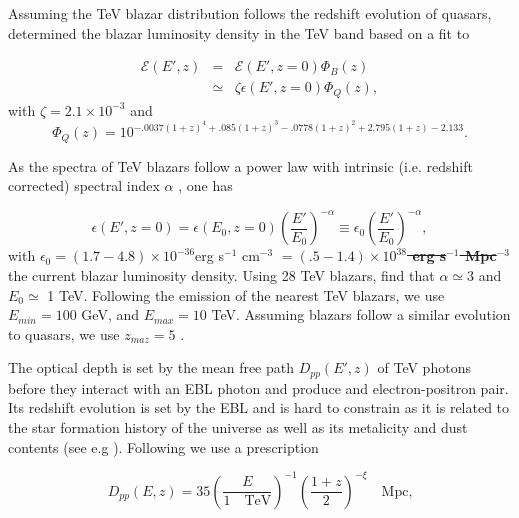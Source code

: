 \documentclass[twocolumns]{emulateapj}
\newcommand\ALc[1]{{\color{red} \bf #1}} %
\begin{document}
Assuming the TeV blazar distribution follows the redshift evolution of quasars, \citet{2012ApJ...752...22B} determined the blazar luminosity density in the TeV band based on a fit to \citet{2007ApJ...654..731H}

\begin{eqnarray}
  \label{eq:mean_heat}
  \mathcal{E}(E',z)&=&\mathcal{E}(E',z=0)\Phi_{B}(z)\\ \nonumber
&\simeq& \zeta\epsilon(E',z=0)\Phi_{Q}(z),
\end{eqnarray}
with $\zeta=2.1\times 10^{-3}$ and
\begin{equation}
  \label{eq:phi_quasar}
 \Phi_{Q}(z)=10^{-.0037(1+z)^4+.085(1+z)^3-.0778(1+z)^2+2.795(1+z)-2.133}. 
\end{equation}
 

As the spectra of TeV blazars follow a power law with intrinsic (i.e. redshift corrected) spectral index $\alpha$ , one has

\begin{equation}
  \label{eq:blaz_lum}
  \epsilon(E',z=0)=\epsilon(E_0,z=0)\left(\frac{E'}{E_0}\right)^{-\alpha}\equiv \epsilon_0\left(\frac{E'}{E_0}\right)^{-\alpha},
\end{equation}
with $\epsilon_0=(1.7-4.8)\times 10^{-36}$erg s$^{-1}$ cm$^{-3}$\ALc{\sout{$=(.5-1.4)\times 10^{38}$ erg s$^{-1}$ Mpc$^{-3}$}} the current blazar luminosity density. Using 28 TeV blazars, \citet{2012ApJ...752...23C} find that $\alpha\simeq 3$ and $E_0\simeq $ 1 TeV. Following the emission of the nearest TeV blazars, we use $E_{min}=100$ GeV,  and $E_{max}=10$ TeV. Assuming blazars follow a similar evolution to quasars, we use $z_{maz}=5$  \citep{2007ApJ...654..731H}.

The optical depth is set by the mean free path  $D_{pp}(E',z)$ of  TeV photons before they interact with an EBL photon and produce and electron-positron pair. Its redshift evolution is set by the EBL and is hard to constrain as it is related to the star formation history of the universe as well as its metalicity and dust contents (see e.g \citet{2008A&A...487..837F,2006ApJ...648..774S}).  Following \citet{2012ApJ...752...23C} we use  a prescription 

  \begin{equation}
    \label{eq:mean_free_path}
  D_{pp}(E,z)=35\left(\frac{E}{1 \quad\textrm{TeV}}\right)^{-1} \left(\frac{1+z}{2}\right)^{-\xi} \quad \textrm{Mpc,}   
  \end{equation}
\end{document}
